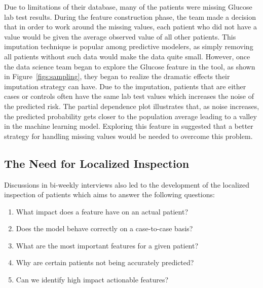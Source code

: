 Due to limitations of their database, many of the patients were missing Glucose lab test results.  During the feature construction phase, the team made a decision that in order to work around the missing values, each patient who did not have a value would be given the average observed value of all other patients.  This imputation technique is popular among predictive modelers, as simply removing all patients without such data would make the data quite small.  However, once the data science team began to explore the Glucose feature in the tool, as shown in Figure~\ref{figs:sampling}, they began to realize the dramatic effects their imputation strategy can have.  Due to the imputation, patients that are either cases or controls often have the same lab test values which increases the noise of the predicted risk.  The partial dependence plot illustrates that, as noise increases, the predicted probability gets closer to the population average leading to a valley in the machine learning model.  Exploring this feature in \prospector suggested that a better strategy for handling missing values would be needed to overcome this problem.

\subsection{The Need for Localized Inspection}

Discussions in bi-weekly interviews also led to the development of the localized inspection of patients
which aims to answer the following questions:
\begin{enumerate}
\item What impact does a feature have on an actual patient?
\item Does the model behave correctly on a case-to-case basis?
\item What are the most important features for a given patient?
\item Why are certain patients not being accurately predicted?
\item Can we identify high impact actionable features?
\end{enumerate}

